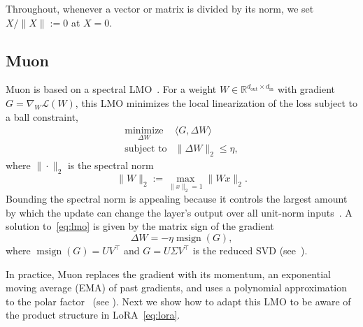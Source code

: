 \documentclass[11pt]{article}
\newcommand{\ip}[1]{\langle #1 \rangle}
\DeclareMathOperator{\msign}{msign}          %
\newcommand{\norm}[1]{\| #1\|}
\theoremstyle{plain}
\theoremstyle{definition}
\theoremstyle{remark}
\theoremstyle{definition}
\begin{document}
Throughout, whenever a vector or matrix is divided by its norm, we set $X/\norm{X}:=0$ at $X=0$.

\subsection{Muon}\label{sec:muon}
Muon is based on a spectral LMO~\cite{bernstein2025modular,pmlr-v38-carlson15,carlson2015preconditioned}.
For a weight $W \in \mathbb{R}^{d_{\mathrm{out}} \times d_{\mathrm{in}}}$ with gradient $G = \nabla_W \mathcal{L}(W)$, this LMO minimizes the local linearization of the loss subject to a ball constraint,
\begin{equation}
 \begin{array}{ll}
  \underset{\Delta W}{\mathrm{minimize}} &
  \ip{G, \Delta W} \\[2pt]
  \mbox{subject to} &
  \displaystyle
  \norm{\Delta W}_2
  \le \eta,
  \end{array}
  \label{eq:lmo}
\end{equation}
where $\|\cdot\|_2$ is the spectral norm 
\[
\|W\|_2 := \max_{\|x\|_2 =1} \|W x \|_2.
\]
Bounding the spectral norm is appealing because it controls the largest amount by which the update can change the layer's output over all unit-norm inputs~\cite{yang2023spectral}.
A solution to~\eqref{eq:lmo} is given by the matrix sign of the gradient~\cite{bernstein2025modular}
\[
    \Delta W = -\eta \msign(G),
\]
where $\msign(G)=UV^\top$ and $G=U\Sigma V^\top$ is the reduced SVD (see~). 

In practice, Muon replaces the gradient with its momentum, an exponential
moving average (EMA) of past gradients, and uses a polynomial approximation
to the polar factor~\cite{polarexpress,gram_ns} (see ). Next we show how to adapt this LMO to be aware of the product structure in LoRA~\eqref{eq:lora}.
\end{document}
